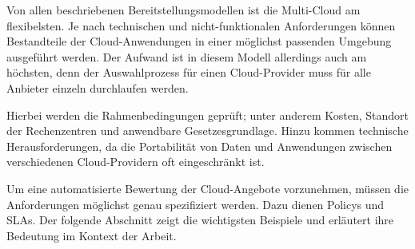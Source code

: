 \noindent
Von allen beschriebenen Bereitstellungsmodellen ist die Multi-Cloud am flexibelsten. Je nach technischen und nicht-funktionalen Anforderungen können Bestandteile der Cloud-Anwendungen in einer möglichst passenden Umgebung ausgeführt werden. Der Aufwand ist in diesem Modell allerdings auch am höchsten, denn der Auswahlprozess für einen Cloud-Provider muss für alle Anbieter einzeln durchlaufen werden.

Hierbei werden die Rahmenbedingungen geprüft; unter anderem Kosten, Standort der Rechenzentren und anwendbare Gesetzesgrundlage. Hinzu kommen technische Herausforderungen, da die Portabilität von Daten und Anwendungen zwischen verschiedenen Cloud-Providern oft eingeschränkt ist.

Um eine automatisierte Bewertung der Cloud-Angebote vorzunehmen, müssen die Anforderungen möglichst genau spezifiziert werden. Dazu dienen Policys und SLAs. Der folgende Abschnitt zeigt die wichtigsten Beispiele und erläutert ihre Bedeutung im Kontext der Arbeit.

%


%

% 
%
%
%



